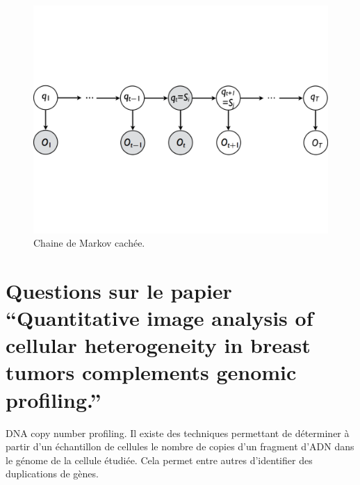 \documentclass[11pt,addpoints]{exam}
\begin{document}
\begin{questions}
\begin{figure}[!ht]
\centering
\includegraphics[width=12cm]{HMM.pdf}
\caption{Chaine de Markov cachée.}
\label{fig:hmm}
\end{figure}



\section{Questions sur le papier ``Quantitative image analysis of
  cellular heterogeneity in breast tumors complements genomic profiling.''}

\question[2] DNA copy number profiling. Il existe des techniques
permettant de déterminer à partir d'un échantillon de cellules  le
nombre de copies d'un fragment d'ADN dans le génome de la cellule
étudiée. Cela permet entre autres d'identifier des duplications de
gènes. 


\end{questions}
\end{document}
